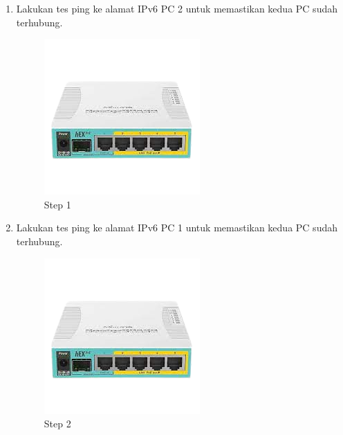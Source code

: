 \begin{enumerate}
	\item Lakukan tes ping ke alamat IPv6 PC 2 untuk memastikan kedua PC sudah terhubung.
	
	\begin{figure}[H]
		\centering
		\includegraphics[width=0.7\linewidth]{P1/img/contoh.png}
		\caption{Step 1}
		\label{fig:gambar1}
	\end{figure}

	\item Lakukan tes ping ke alamat IPv6 PC 1 untuk memastikan kedua PC sudah terhubung.
	
	\begin{figure}[H]
		\centering
		\includegraphics[width=0.7\linewidth]{P1/img/contoh.png}
		\caption{Step 2}
		\label{fig:gambar1}
	\end{figure}

\end{enumerate}

